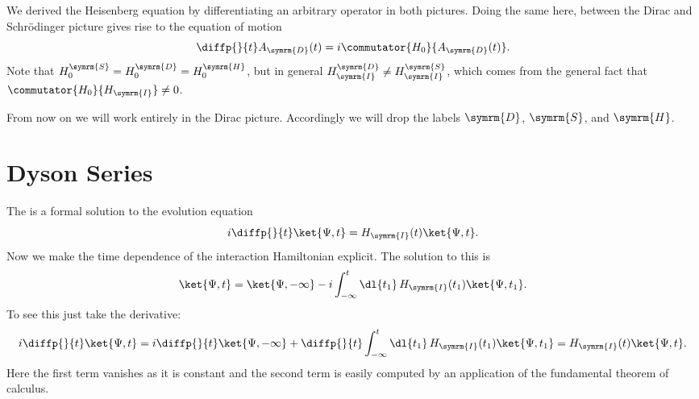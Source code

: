 \documentclass[fleqn]{NotesClass}
\newcommand{\interaction}{\symrm{I}}
\begin{document}
    We derived the Heisenberg equation by differentiating an arbitrary operator in both pictures.
    Doing the same here, between the Dirac and Schrödinger picture gives rise to the equation of motion
    \begin{equation}
        \diffp{}{t} A_{\symrm{D}}(t) = i\commutator{H_0}{A_{\symrm{D}}(t)}.
    \end{equation}
    Note that \(H_0^{\symrm{S}} = H_0^{\symrm{D}} = H_0^{\symrm{H}}\), but in general \(H_{\interaction}^{\symrm{D}} \ne H_{\interaction}^{\symrm{S}}\), which comes from the general fact that \(\commutator{H_0}{H_{\interaction}} \ne 0\).
    
    From now on we will work entirely in the Dirac picture.
    Accordingly we will drop the labels \(\symrm{D}\), \(\symrm{S}\), and \(\symrm{H}\).
    
    \section{Dyson Series}
    The  is a formal solution to the evolution equation
    \begin{equation}
        i\diffp{}{t}\ket{\Psi, t} = H_{\interaction}(t) \ket{\Psi, t}.
    \end{equation}
    Now we make the time dependence of the interaction Hamiltonian explicit.
    The solution to this is
    \begin{equation}\label{eqn:to iterate for dyson series}
        \ket{\Psi, t} = \ket{\Psi, -\infty} - i \int_{-\infty}^{t} \dl{t_1} \, H_{\interaction}(t_1) \ket{\Psi, t_1}.
    \end{equation}
    To see this just take the derivative:
    \begin{equation}
        i\diffp{}{t}\ket{\Psi, t} = i\diffp{}{t}\ket{\Psi, -\infty} + \diffp{}{t}\int_{-\infty}^{t} \dl{t_1} \, H_{\interaction}(t_1)\ket{\Psi, t_1} = H_{\interaction}(t) \ket{\Psi, t}.
    \end{equation}
    Here the first term vanishes as it is constant and the second term is easily computed by an application of the fundamental theorem of calculus.
    
\end{document}
